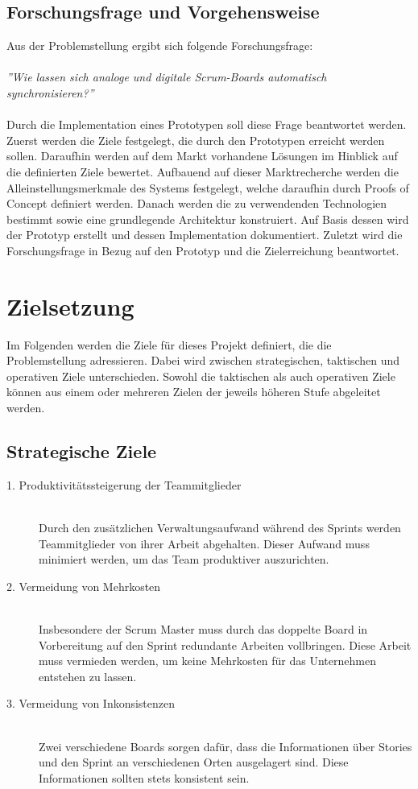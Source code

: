 \documentclass[12pt,titlepage]{scrartcl}
\begin{document}
		\subsection{Forschungsfrage und Vorgehensweise}
		Aus der Problemstellung ergibt sich folgende Forschungsfrage: \\ \\
		\textit{''Wie lassen sich analoge und digitale Scrum-Boards automatisch synchronisieren?''} \\ \\
		Durch die Implementation eines Prototypen soll diese Frage beantwortet werden. Zuerst werden die Ziele festgelegt, die durch den Prototypen erreicht werden sollen. Daraufhin werden auf dem Markt vorhandene Lösungen im Hinblick auf die definierten Ziele bewertet. Aufbauend auf dieser Marktrecherche werden die Alleinstellungsmerkmale des Systems festgelegt, welche daraufhin durch Proofs of Concept definiert werden. Danach werden die zu verwendenden Technologien bestimmt sowie eine grundlegende Architektur konstruiert. Auf Basis dessen wird der Prototyp erstellt und dessen Implementation dokumentiert. Zuletzt wird die Forschungsfrage in Bezug auf den Prototyp und die Zielerreichung beantwortet.
	\newpage	
	\section{Zielsetzung} \label{Zielsetzung}
	Im Folgenden werden die Ziele für dieses Projekt definiert, die die Problemstellung adressieren. Dabei wird zwischen strategischen, taktischen und operativen Ziele unterschieden. Sowohl die taktischen als auch operativen Ziele können aus einem oder mehreren Zielen der jeweils höheren Stufe abgeleitet werden.
		\subsection{Strategische Ziele}
		\begin{description}
 			\item[1. Produktivitätssteigerung der Teammitglieder] \hfill \\
 			Durch den zusätzlichen Verwaltungsaufwand während des Sprints werden Teammitglieder von ihrer Arbeit abgehalten. Dieser Aufwand muss minimiert werden, um das Team produktiver auszurichten.
 			\item[2. Vermeidung von Mehrkosten] \hfill \\
 			Insbesondere der Scrum Master muss durch das doppelte Board in Vorbereitung auf den Sprint redundante Arbeiten vollbringen. Diese Arbeit muss vermieden werden, um keine Mehrkosten für das Unternehmen entstehen zu lassen.
 			\item[3. Vermeidung von Inkonsistenzen] \hfill \\
 			Zwei verschiedene Boards sorgen dafür, dass die Informationen über Stories und den Sprint an verschiedenen Orten ausgelagert sind. Diese Informationen sollten stets konsistent sein. 
		\end{description}
\end{document}
